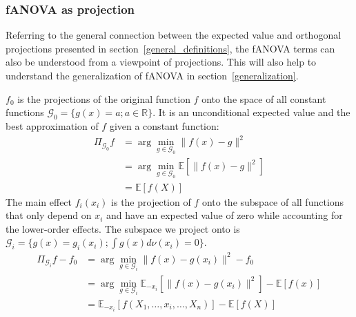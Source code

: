 






\subsubsection*{fANOVA as projection}
Referring to the general connection between the expected value and orthogonal projections presented in section~\ref{general_definitions}, the fANOVA terms can also be understood from a viewpoint of projections. This will also help to understand the generalization of fANOVA in section~\ref{generalization}.\par

$f_0$ is the projections of the original function $f$ onto the space of all constant functions $\mathcal{G}_0 = \{g(x) = a; a \in \mathbb{R}\}$. It is an unconditional expected value and the best approximation of $f$ given a constant function:
\begin{align*}
    \Pi_{\mathcal{G}_0}f
    &= \arg \min_{g \in \mathcal{G}_0} \|f(x) - g\|^2 \\
    &= \arg \min_{g \in \mathcal{G}_0} \mathbb{E}[\|f(x) - g\|^2] \\
    &= \mathbb{E}[f(X)]
\end{align*}
The main effect $f_i(x_i)$ is the projection of $f$ onto the subspace of all functions that only depend on $x_i$ and have an expected value of zero while accounting for the lower-order effects. The subspace we project onto is $\mathcal{G}_i = \{g(x) = g_i(x_i); \int g(x) d\nu (x_i) = 0\}$.
\begin{align*}
    \Pi_{\mathcal{G}_i}f - f_0
    &= \arg \min_{g \in \mathcal{G}_i} \|f(x) - g(x_i)\|^2 - f_0\\
    &= \arg \min_{g \in \mathcal{G}_i} \mathbb{E}_{-x_i}[\|f(x) - g(x_i)\|^2] - \mathbb{E}[f(x)] \\
    &= \mathbb{E}_{-x_i}[f(X_1, \dots, x_i, \dots, X_n)] - \mathbb{E}[f(X)]
\end{align*}

